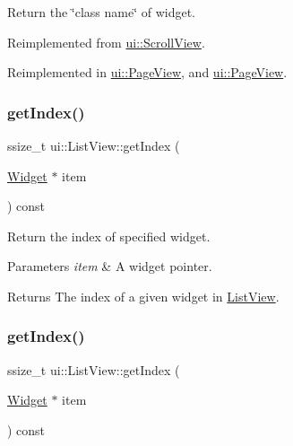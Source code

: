 Return the \char`\"{}class name\char`\"{} of widget. 

Reimplemented from \hyperlink{classui_1_1ScrollView_a3a808390a8d9162dbbf83d5211e87f2e}{ui\+::\+Scroll\+View}.



Reimplemented in \hyperlink{classui_1_1PageView_aead0575c0e5d24da3731501afadf81e9}{ui\+::\+Page\+View}, and \hyperlink{classui_1_1PageView_a3c9b2934fdbbb44e2c456feee27b53de}{ui\+::\+Page\+View}.

\mbox{\label{classui_1_1ListView_a4f0306a68670aba071042347db7fe21e}} 
\subsubsection{\texorpdfstring{get\+Index()}{getIndex()}\hspace{0.1cm}{\footnotesize\ttfamily [1/2]}}
{\footnotesize\ttfamily ssize\+\_\+t ui\+::\+List\+View\+::get\+Index (\begin{DoxyParamCaption}\item[{\hyperlink{classui_1_1Widget}{Widget} $\ast$}]{item }\end{DoxyParamCaption}) const}

Return the index of specified widget.


\begin{DoxyParams}{Parameters}
{\em item} & A widget pointer. \\
\hline
\end{DoxyParams}
\begin{DoxyReturn}{Returns}
The index of a given widget in \hyperlink{classui_1_1ListView}{List\+View}. 
\end{DoxyReturn}
\mbox{\label{classui_1_1ListView_a4f0306a68670aba071042347db7fe21e}} 
\subsubsection{\texorpdfstring{get\+Index()}{getIndex()}\hspace{0.1cm}{\footnotesize\ttfamily [2/2]}}
{\footnotesize\ttfamily ssize\+\_\+t ui\+::\+List\+View\+::get\+Index (\begin{DoxyParamCaption}\item[{\hyperlink{classui_1_1Widget}{Widget} $\ast$}]{item }\end{DoxyParamCaption}) const}


